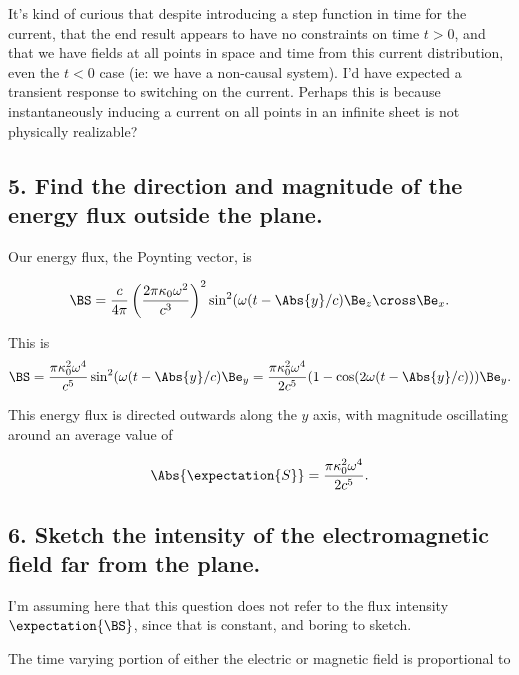 It's kind of curious that despite introducing a step function in time for the current, that the end result appears to have no constraints on time $t > 0$, and that we have fields at all points in space and time from this current distribution, even the $t < 0$ case (ie: we have a non-causal system).  I'd have expected a transient response to switching on the current.  Perhaps this is because instantaneously inducing a current on all points in an infinite sheet is not physically realizable?

\subsection{5. Find the direction and magnitude of the energy flux outside the plane.}

Our energy flux, the Poynting vector, is

\begin{equation}\label{eqn:relElectroDynProblemSet5P1:220}
\BS 
= \frac{c}{4\pi}
\left( \frac{
2 \pi \kappa_0 \omega^2
}{c^3} \right)^2 \sin^2(\omega(t - \Abs{y}/c) \Be_z \cross \Be_x.
\end{equation}

This is
\begin{equation}\label{eqn:relElectroDynProblemSet5P1:240}
\BS 
= 
\frac{ \pi \kappa_0^2 \omega^4 }{c^5} \sin^2(\omega(t - \Abs{y}/c) \Be_y
= 
\frac{ \pi \kappa_0^2 \omega^4 }{2 c^5} (1 - \cos( 2 \omega(t - \Abs{y}/c) ) ) \Be_y.
\end{equation}

This energy flux is directed outwards along the $y$ axis, with magnitude oscillating around an average value of

\begin{equation}\label{eqn:relElectroDynProblemSet5P1:260}
\Abs{\expectation{S}} = \frac{ \pi \kappa_0^2 \omega^4 }{2 c^5}.
\end{equation}

\subsection{6. Sketch the intensity of the electromagnetic field far from the plane.}

I'm assuming here that this question does not refer to the flux intensity $\expectation{\BS}$, since that is constant, and boring to sketch.

The time varying portion of either the electric or magnetic field is proportional to

